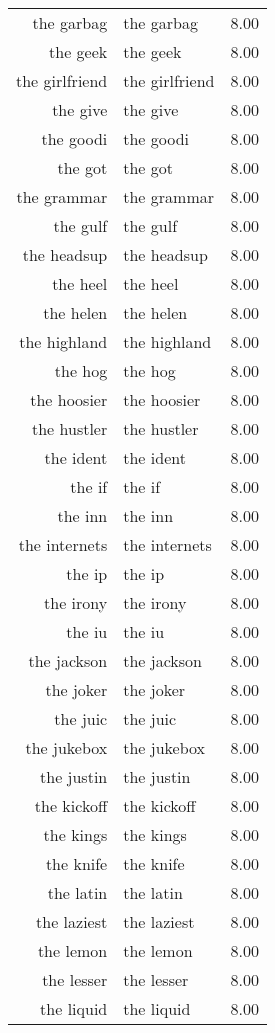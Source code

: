 \begin{table}[ht]
\begin{tabular}{rlr}
  the garbag & the garbag & 8.00 \\ 
  the geek & the geek & 8.00 \\ 
  the girlfriend & the girlfriend & 8.00 \\ 
  the give & the give & 8.00 \\ 
  the goodi & the goodi & 8.00 \\ 
  the got & the got & 8.00 \\ 
  the grammar & the grammar & 8.00 \\ 
  the gulf & the gulf & 8.00 \\ 
  the headsup & the headsup & 8.00 \\ 
  the heel & the heel & 8.00 \\ 
  the helen & the helen & 8.00 \\ 
  the highland & the highland & 8.00 \\ 
  the hog & the hog & 8.00 \\ 
  the hoosier & the hoosier & 8.00 \\ 
  the hustler & the hustler & 8.00 \\ 
  the ident & the ident & 8.00 \\ 
  the if & the if & 8.00 \\ 
  the inn & the inn & 8.00 \\ 
  the internets & the internets & 8.00 \\ 
  the ip & the ip & 8.00 \\ 
  the irony & the irony & 8.00 \\ 
  the iu & the iu & 8.00 \\ 
  the jackson & the jackson & 8.00 \\ 
  the joker & the joker & 8.00 \\ 
  the juic & the juic & 8.00 \\ 
  the jukebox & the jukebox & 8.00 \\ 
  the justin & the justin & 8.00 \\ 
  the kickoff & the kickoff & 8.00 \\ 
  the kings & the kings & 8.00 \\ 
  the knife & the knife & 8.00 \\ 
  the latin & the latin & 8.00 \\ 
  the laziest & the laziest & 8.00 \\ 
  the lemon & the lemon & 8.00 \\ 
  the lesser & the lesser & 8.00 \\ 
  the liquid & the liquid & 8.00 \\ 

\end{tabular}
\end{table}

